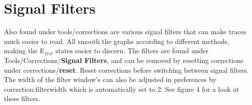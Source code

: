 \documentclass[11pt,a5paper,footinclude=true,headinclude=true]{scrbook} %
\begin{document}
    \section{Signal Filters}
    Also found under tools/corrections are various signal filters that can make traces much easier to read. All smooth the graphs according to different methods, making the E$_{fret}$ states easier to discern. The filters are found under Tools/Corrections/\textbf{Signal Filters}, and can be removed by resetting corrections under corrections/\textbf{reset}. Reset corrections before switching between signal filters. The width of the filter window's can also be adjusted in preferences by correction.filterwidth which is automatically set to 2. See figure 4 for a look at these filters. 
    
\end{document}
